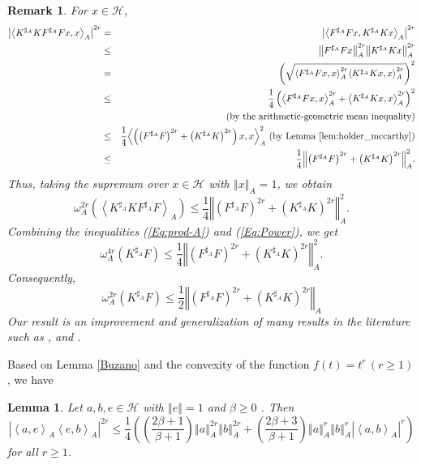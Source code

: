 \documentclass{article}
\newcommand{\bra}[1]{\left(#1\right)}
\newcommand{\seqA}[1]{{\left<#1\right>}_{A}}
\newcommand{\norm}[1]{\left\Vert#1\right\Vert}
\newcommand{\normA}[1]{{\left\Vert#1\right\Vert}_{A}}
\newcommand{\abs}[1]{\left\vert#1\right\vert}
\newcommand {\h}{\mathcal{H}}
\newtheorem{lemma}[theorem]{Lemma}
\newtheorem{remark}[theorem]{Remark}
\begin{document}
 \begin{remark} For $x\in\h$,
 \begin{eqnarray*}
  \abs{\seqA{K^{\sharp_A}KF^{\sharp_A}Fx,x}}^{2r} &=& \abs{\seqA{F^{\sharp_A}Fx,K^{\sharp_A}Kx}}^{2r} \\
   &\leq&\normA{F^{\sharp_A}Fx}^{2r}\normA{K^{\sharp_A}Kx}^{2r}\\
   &=& \bra{\sqrt{\seqA{F^{\sharp_A}Fx,x}^{2r}\seqA{K^{\sharp_A}Kx,x}^{2r}}}^{2}\\
   &\leq& \frac{1}{4}\bra{\seqA{F^{\sharp_A}Fx,x}^{2r}+\seqA{K^{\sharp_A}Kx,x}^{2r}}^2 \\
   &&\bra{\mbox{by the arithmetic-geometric mean inequality}}\\
   &\leq& \frac{1}{4}\seqA{\bra{\bra{F^{\sharp_A}F}^{2r}+\bra{K^{\sharp_A}K}^{2r}}x,x}^{2}\,\bra{\mbox{by Lemma \ref{lem:holder_mccarthy}}}\\
   &\leq&\frac{1}{4} \normA{\bra{F^{\sharp_A}F}^{2r}+\bra{K^{\sharp_A}K}^{2r}}^{2}.
 \end{eqnarray*}
 Thus, taking the supremum over $x\in\h$ with $\normA{x}=1$, we obtain
 \begin{equation}\label{Eq:Power}
   \omega_A^{2r}\bra{\seqA{K^{\sharp_A}KF^{\sharp_A}F}}\leq \frac{1}{4} \normA{\bra{F^{\sharp_A}F}^{2r}+\bra{K^{\sharp_A}K}^{2r}}^{2}.
 \end{equation}
 Combining the inequalities (\ref{Eq:prod-A}) and (\ref{Eq:Power}), we get
 \begin{equation}\label{Eq:Power-4r}
   \omega_A^{4r}\bra{K^{\sharp_A}F} \leq \frac{1}{4}\normA{\bra{F^{\sharp_A}F}^{2r}+\bra{K^{\sharp_A}K}^{2r}}^{2}.
 \end{equation}
 Consequently,
 \begin{equation}\label{Eq:Power-2r}
   \omega_A^{2r}\bra{K^{\sharp_A}F} \leq \frac{1}{2}\normA{\bra{F^{\sharp_A}F}^{2r}+\bra{K^{\sharp_A}K}^{2r}}
 \end{equation}
 Our result is an improvement and generalization of many results in the literature  such as
 \cite[Inequality (3.4)]{QHC}, \cite[Theorem 2.7]{CF} and \cite[Theorem 2.3]{BPN}.
 \end{remark}
 Based on Lemma \ref{Buzano} and the convexity of the function $f(t)=t^r\,(r\geq 1)$, we have
\begin{lemma} \label{modified-Buzano}  Let $a,b,e\in\h$ with $\norm{e}=1$ and $\beta\geq 0$ . Then
  \begin{equation}\label{Mohd-Ineq.}
  \abs{\seqA{a,e}\seqA{e,b}}^{2r}\leq \frac{1}{4}\bra{\bra{\frac{2\beta+1}{\beta+1}}\normA{a}^{2r}\normA{b}^{2r}+
  \bra{\frac{2\beta+3}{\beta+1}}\normA{a}^r\normA{b}^r\abs{\seqA{a,b}}^{r}}
\end{equation}
for all $r\geq 1$.
\end{lemma}
\end{document}
